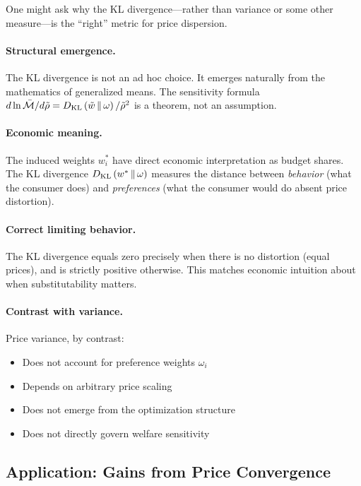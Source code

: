 One might ask why the KL divergence---rather than variance or some other measure---is the ``right'' metric for price dispersion.

\paragraph{Structural emergence.}
The KL divergence is not an ad hoc choice. It emerges naturally from the mathematics of generalized means. The sensitivity formula $d \ln \bar{\mathcal{M}} / d\tilde{\rho} = D_{\mathrm{KL}}\left(\tilde{w} \,\|\, \omega\right)/\tilde{\rho}^2$ is a theorem, not an assumption.

\paragraph{Economic meaning.}
The induced weights $w_i^*$ have direct economic interpretation as budget shares. The KL divergence $D_{\mathrm{KL}}\left(w^* \,\|\, \omega\right)$ measures the distance between \emph{behavior} (what the consumer does) and \emph{preferences} (what the consumer would do absent price distortion).

\paragraph{Correct limiting behavior.}
The KL divergence equals zero precisely when there is no distortion (equal prices), and is strictly positive otherwise. This matches economic intuition about when substitutability matters.

\paragraph{Contrast with variance.}
Price variance, by contrast:
\begin{itemize}[nosep, leftmargin=1.5em]
    \item Does not account for preference weights $\omega_i$
    \item Depends on arbitrary price scaling
    \item Does not emerge from the optimization structure
    \item Does not directly govern welfare sensitivity
\end{itemize}

\subsection{Application: Gains from Price Convergence}
\label{subsec:price-convergence}

